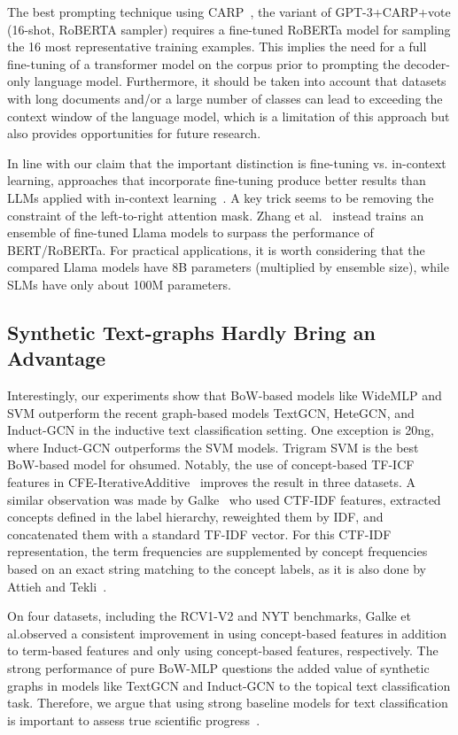 \documentclass[acmsmall,nonacm]{acmart}
\newcommand{\SLMs}{SLMs\xspace}
\newcommand{\LLMs}{LLMs\xspace}
\begin{document}
The best prompting technique using CARP~\cite{carp}, \ie the variant of GPT-3+CARP+vote (16-shot, RoBERTA sampler)  requires a fine-tuned RoBERTa model for sampling the 16 most representative training examples.
This implies the need for a full fine-tuning of a transformer model on the corpus prior to prompting the decoder-only language model. 
Furthermore, it should be taken into account that datasets with long documents and/or a large number of classes can lead to exceeding the context window of the language model, which is a limitation of this approach but also provides opportunities for future research.

In line with our claim that the important distinction is fine-tuning vs. in-context learning, approaches that incorporate fine-tuning produce better results than \LLMs applied with in-context learning~\cite{li2023label,DBLP:journals/corr/abs-2402-07470-pushing-the-limit}. A key trick seems to be removing the constraint of the left-to-right attention mask. Zhang et al.~\cite{DBLP:journals/corr/abs-2402-07470-pushing-the-limit} instead trains an ensemble of fine-tuned Llama models to surpass the performance of BERT/RoBERTa.  For practical applications, it is worth considering that the compared Llama models have 8B parameters (multiplied by ensemble size), while \SLMs have only about 100M parameters.

\subsection{Synthetic Text-graphs Hardly Bring an Advantage}
Interestingly, our experiments show that BoW-based models like WideMLP and SVM outperform the recent graph-based models TextGCN, HeteGCN, and Induct-GCN in the inductive text classification setting.
One exception is 20ng, where Induct-GCN outperforms the SVM models.
Trigram SVM is the best BoW-based model for ohsumed.
Notably, the use of concept-based TF-ICF features in CFE-IterativeAdditive~\cite{ATTIEH2023110215} improves the result in three datasets. 
A similar observation was made by Galke~\etal\cite{DBLP:conf/kcap/GalkeMSBS17} who used CTF-IDF features, \ie extracted concepts defined in the label hierarchy, reweighted them by IDF, and concatenated them with a standard TF-IDF vector. 
For this CTF-IDF representation, the term frequencies are supplemented by concept frequencies based on an exact string matching to the concept labels, as it is also done by Attieh and Tekli~\cite{ATTIEH2023110215}.

On four datasets, including the RCV1-V2 and NYT benchmarks, Galke et al.\@ observed a consistent improvement in using concept-based features in addition to term-based features and only using concept-based features, respectively.
The strong performance of pure BoW-MLP questions the added value of synthetic graphs in models like TextGCN and Induct-GCN to the topical text classification task.
Therefore, we argue that using strong baseline models for text classification is important to assess true scientific progress~\cite{DBLP:conf/recsys/DacremaCJ19}.
\end{document}
